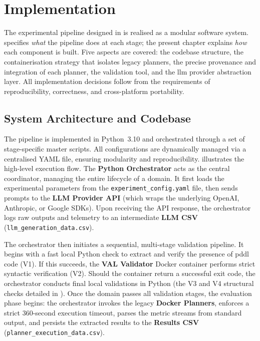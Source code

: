 
\chapter{Implementation}\label{ch:implementation}

The experimental pipeline designed in  is realised as a modular software system.
 specifies \emph{what} the pipeline does at each stage; the present chapter explains \emph{how} each component is built.
Five aspects are covered: the codebase structure, the containerisation strategy that isolates legacy planners, the precise provenance and integration of each planner, the validation tool, and the \gls{llm} provider abstraction layer.
All implementation decisions follow from the requirements of reproducibility, correctness, and cross-platform portability.

\section{System Architecture and Codebase}
\label{sec:impl:codebase}

The pipeline is implemented in Python~3.10 and orchestrated through a set of stage-specific master scripts.
All configurations are dynamically managed via a centralised YAML file, ensuring modularity and reproducibility.
 illustrates the high-level execution flow.
The \textbf{Python Orchestrator} acts as the central coordinator, managing the entire lifecycle of a domain.
It first loads the experimental parameters from the \texttt{experiment\_config.yaml} file, then sends prompts to the \textbf{LLM Provider API} (which wraps the underlying OpenAI, Anthropic, or Google SDKs).
Upon receiving the API response, the orchestrator logs raw outputs and telemetry to an intermediate \textbf{LLM CSV} (\texttt{llm\_generation\_data.csv}).

The orchestrator then initiates a sequential, multi-stage validation pipeline.
It begins with a fast local Python check to extract and verify the presence of \gls{pddl} code (V1).
If this succeeds, the \textbf{VAL Validator} Docker container performs strict syntactic verification (V2).
Should the container return a successful exit code, the orchestrator conducts final local validations in Python (the V3 and V4 structural checks detailed in ).
Once the domain passes all validation stages, the evaluation phase begins: the orchestrator invokes the legacy \textbf{Docker Planners}, enforces a strict 360-second execution timeout, parses the metric streams from standard output, and persists the extracted results to the \textbf{Results CSV} (\texttt{planner\_execution\_data.csv}).

